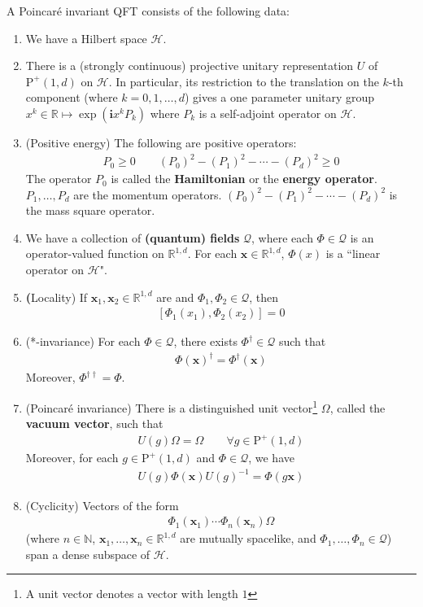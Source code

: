 \documentclass[12pt,b5paper,notitlepage]{article}
\theoremstyle{definition}
\theoremstyle{plain}
\newcommand{\mc}{\mathcal}
\newcommand{\scr}{\mathscr}
\newcommand{\im}{\mathbf{i}}
\newcommand{\mbf}{\mathbf}
\newcommand{\Nbb}{\mathbb N}
\newcommand{\Rbb}{\mathbb R}
\newcommand{\Poid}{{\mathrm P}^+(1,d)}
\newcommand{\xbf}{\mathbf x}
\numberwithin{equation}{section}
\begin{document}
A Poincar\'e invariant QFT consists of the following data:
\begin{enumerate}[label=(\arabic*)]
\item We have a Hilbert space $\mc H$.
\item There is a (strongly continuous) projective unitary representation $U$ of $\Poid$ on $\mc H$. In particular, its restriction to the translation on the $k$-th component (where $k=0,1,\dots,d$) gives a one parameter unitary group $x^k\in\Rbb\mapsto \exp(\im x^k P_k)$ where $P_k$ is a self-adjoint operator on $\mc H$.
\item (Positive energy) The following are positive operators:
\begin{align*}
P_0\geq0\qquad (P_0)^2-(P_1)^2-\cdots-(P_d)^2\geq0
\end{align*}
The operator $P_0$ is called the \textbf{Hamiltonian} or the \textbf{energy operator}. $P_1,\dots,P_d$ are the momentum operators. $(P_0)^2-(P_1)^2-\cdots-(P_d)^2$ is the mass square operator.
\item We have a collection of \textbf{(quantum) fields} $\scr Q$, where each $\Phi\in\scr Q$ is an operator-valued function on $\Rbb^{1,d}$. For each $\mbf x\in\Rbb^{1,d}$, $\Phi(x)$ is a ``linear operator on $\mc H$".  
\item {\textbf(Locality})  If $\xbf_1,\xbf_2\in\Rbb^{1,d}$ are  and $\Phi_1,\Phi_2\in\scr Q$, then
\begin{align}\label{eq18}
[\Phi_1(x_1),\Phi_2(x_2)]=0
\end{align}
\item (*-invariance) For each $\Phi\in\scr Q$, there exists $\Phi^\dagger\in\scr Q$ such that
\begin{align}\label{eq3}
\Phi(\xbf)^\dagger=\Phi^\dagger(\xbf)
\end{align}
Moreover, $\Phi^{\dagger\dagger}=\Phi$.
\item (Poincar\'e invariance) There is a distinguished unit vector\footnote{A unit vector denotes a vector with length $1$} $\Omega$, called the \textbf{vacuum vector}, such that
\begin{align*}
U(g)\Omega=\Omega\qquad\forall g\in\Poid
\end{align*}
Moreover, for each $g\in\Poid$ and $\Phi\in\scr Q$, we have
\begin{align}\label{eq2}
U(g)\Phi(\xbf)U(g)^{-1}=\Phi(g\xbf)
\end{align}
\item (Cyclicity) Vectors of the form
\begin{align}\label{eq4}
\Phi_1(\xbf_1)\cdots\Phi_n(\xbf_n)\Omega
\end{align}
(where $n\in\Nbb$, $\xbf_1,\dots,\xbf_n\in\Rbb^{1,d}$ are mutually spacelike, and $\Phi_1,\dots,\Phi_n\in\scr Q$) span a dense subspace of $\mc H$.
\end{enumerate}
\end{document}
